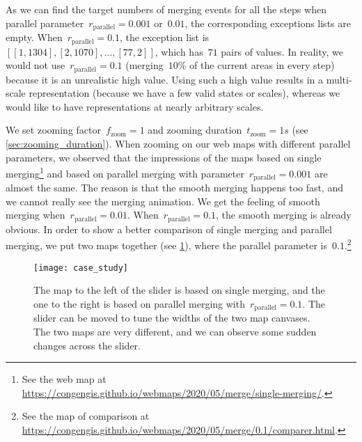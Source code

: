 \documentclass[]{interact}
\begin{document}
As we can find the target numbers of merging events for all the steps
when parallel parameter~$r_\mathrm{parallel}= 0.001$ or~$0.01$, 
the corresponding exceptions lists are empty.
When~$r_\mathrm{parallel}= 0.1$,
the exception list is~$[[1, 1304], [2, 1070], \dots, [77, 2]]$,
which has~$71$ pairs of values.
In reality, we would not use~$r_\mathrm{parallel}= 0.1$
(merging~$10\%$ of the current areas in every step)
because it is an unrealistic high value.
Using such a high value results in a multi-scale representation
(because we have a few valid states or scales),
whereas we would like to have representations at nearly
arbitrary scales.




We set zooming factor~$f_\mathrm{zoom}=1$ and 
zooming duration~$t_\mathrm{zoom}=1 s$ 
(see \sect\ref{sec:zooming_duration}).
When zooming on our web maps with different parallel parameters,
we observed that the impressions of the maps 
based on single merging\footnote{%
See the web map at
\url{https://congengis.github.io/webmaps/2020/05/merge/single-merging/}.} 
and based on parallel merging with parameter~$r_\mathrm{parallel}= 0.001$ 
are almost the same.
The reason is that the smooth merging happens too fast,
and we cannot really see the merging animation.
We get the feeling of smooth merging when~$r_\mathrm{parallel}= 0.01$.
When~$r_\mathrm{parallel}= 0.1$, the smooth merging is already obvious.
In order to show a better comparison of single merging 
and parallel merging,
we put two maps together (see \fig\ref{fig:comparison}),
where the parallel parameter is~$0.1$.\footnote{%
See the map of comparison at
\url{https://congengis.github.io/webmaps/2020/05/merge/0.1/comparer.html}.}  


\begin{figure}[tb]
\centering
\texttt{[image: case\_study]}
\caption{
    The map to the left of the slider is based on single merging,
    and the one to the right is based on parallel merging
    with~$r_\mathrm{parallel}= 0.1$.
    The slider can be moved to tune the widths of the two map canvases.
    The two maps are very different, and 
    we can observe some sudden changes across the slider.
}
\label{fig:comparison}
\end{figure}
\end{document}
